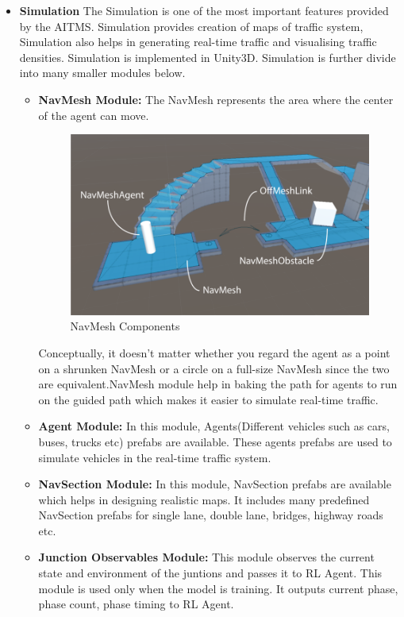 \documentclass[openany,12pt]{report}
\begin{document}
		\begin{itemize}
			
			\item{\textbf{Simulation} The Simulation is one of the most important features provided by the AITMS. Simulation provides creation of maps of traffic system, Simulation also helps in generating real-time traffic and visualising traffic densities. Simulation is implemented in Unity3D. Simulation is further divide into many smaller modules below. \begin{itemize}
			\item{\textbf{NavMesh Module:} The NavMesh represents the area where the center of the agent can move. 
			\begin{figure}[H]
				\centering
				\includegraphics[width=3 in]{./Diagrams/PNG/NavMeshModule}
				\caption{NavMesh Components}
			\end{figure}
			Conceptually, it doesn’t matter whether you regard the agent as a point on a shrunken NavMesh or a circle on a full-size NavMesh since the two are equivalent.NavMesh module help in baking the path for agents to run on the guided path which makes it easier to simulate real-time traffic.}
			
			\item{\textbf{Agent Module:} In this module, Agents(Different vehicles such as cars, buses, trucks etc) prefabs are available. These agents prefabs are used to simulate vehicles in the real-time traffic system.}
			\item{\textbf{NavSection Module:} In this module, NavSection prefabs are available which helps in designing realistic maps. It includes many predefined NavSection prefabs for single lane, double lane, bridges, highway roads etc. }
			\item{\textbf{Junction Observables Module:} This module observes the current state and environment of the juntions and passes it to RL Agent. This module is used only when the model is training. It outputs current phase, phase count, phase timing  to RL Agent.}
\end{itemize}			 }
			

\end{itemize}
\end{document}
